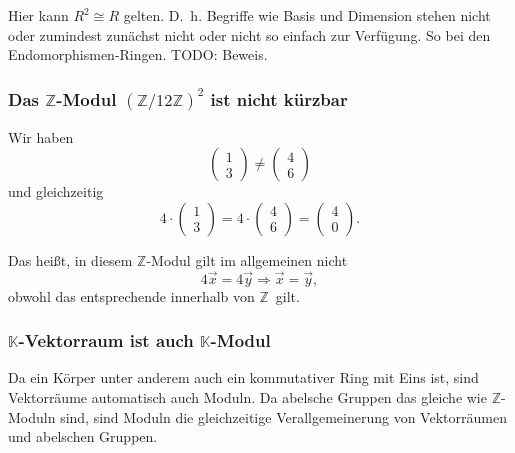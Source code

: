 \documentclass[a4paper]{amsart}
\theoremstyle{definition}
\newcommand{\Z}{\ensuremath{\mathbb{ Z }}}
\newcommand{\K}{\ensuremath{\mathbb{ K }}}
\newcommand{\zz}[1]{\ensuremath{\Z /#1\Z}}
\begin{document}
Hier kann $R^2 \cong R$ gelten. D.~h. Begriffe wie Basis und Dimension stehen nicht oder zumindest zunächst nicht oder nicht so einfach zur Verfügung. So bei den Endomorphismen-Ringen. TODO: Beweis.



\subsubsection{Das \Z-Modul $(\zz{12})^2$ ist nicht kürzbar}
Wir haben
\begin{equation}
   \begin{pmatrix} 1 \\ 3 \end{pmatrix} \ne
   \begin{pmatrix} 4 \\ 6 \end{pmatrix}
\end{equation}
und gleichzeitig
\begin{equation}
   4 \cdot \begin{pmatrix} 1 \\ 3 \end{pmatrix} =
   4 \cdot \begin{pmatrix} 4 \\ 6 \end{pmatrix} =
          \begin{pmatrix} 4 \\ 0 \end{pmatrix}.
\end{equation}

Das heißt, in diesem \Z-Modul gilt im allgemeinen nicht
\begin{equation}
   4 \vec x = 4 \vec y \Rightarrow \vec x = \vec y,
\end{equation}
obwohl das entsprechende innerhalb von \Z\ gilt.

\subsubsection{$\K$-Vektorraum ist auch $\K$-Modul}
Da ein Körper unter anderem auch ein kommutativer Ring mit Eins ist, sind Vektorräume automatisch auch Moduln. Da abelsche Gruppen das gleiche wie \Z-Moduln sind, sind Moduln die gleichzeitige Verallgemeinerung von Vektorräumen und abelschen Gruppen.
\end{document}
